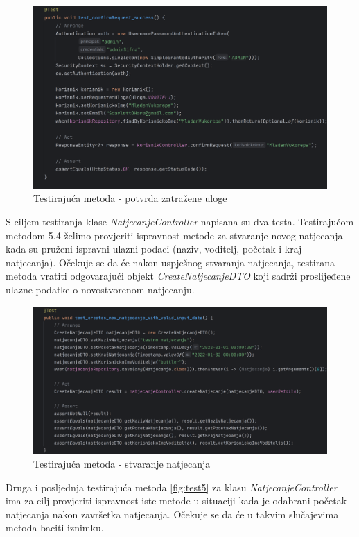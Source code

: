 \begin{figure}[H]
	\includegraphics[scale=0.15]{slike/test3.png}
	\centering
	\caption{Testirajuća metoda - potvrda zatražene uloge}
	\label{fig:test3}
\end{figure}

S ciljem testiranja klase \textit{NatjecanjeController} napisana su dva testa. Testirajućom metodom 5.4 želimo provjeriti ispravnost metode za stvaranje novog natjecanja kada su pruženi ispravni ulazni podaci (naziv, voditelj, početak i kraj natjecanja). Očekuje se da će nakon uspješnog stvaranja natjecanja, testirana metoda vratiti odgovarajući objekt \textit{CreateNatjecanjeDTO} koji sadrži proslijeđene ulazne podatke o novostvorenom natjecanju.

\begin{figure}[H]
	\includegraphics[scale=0.15]{slike/test4.png}
	\centering
	\caption{Testirajuća metoda - stvaranje natjecanja}
	\label{fig:test4}
\end{figure}

Druga i posljednja testirajuća metoda \ref{fig:test5} za klasu \textit{NatjecanjeController} ima za cilj provjeriti ispravnost iste metode u situaciji kada je odabrani početak natjecanja nakon završetka natjecanja. Očekuje se da će u takvim slučajevima metoda baciti iznimku.

